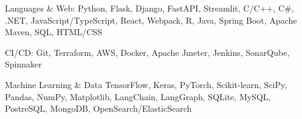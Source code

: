 
\begin{cvskills}

  \cvskill
    {Languages \& Web:} %
    {Python, Flask, Django, FastAPI, Streamlit, C/C++, C\#, .NET, JavaScript/TypeScript, React, Webpack, R, Java, Spring Boot, Apache Maven, SQL, HTML/CSS} %

  \cvskill
    {CI/CD:}
    {Git, Terraform, AWS, Docker, Apache Jmeter, Jenkins, SonarQube, Spinnaker}

  \cvskill
    {Machine Learning \& Data}
    {TensorFlow, Keras, PyTorch, Scikit-learn, SciPy, Pandas, NumPy, Matplotlib, LangChain, LangGraph, SQLite, MySQL, PostreSQL, MongoDB, OpenSearch/ElasticSearch}

\end{cvskills}
